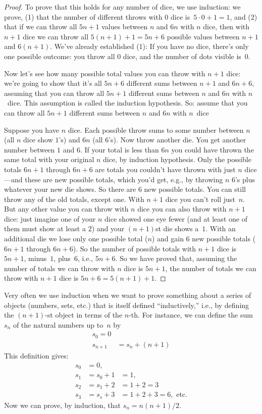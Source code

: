 \documentclass[../../../include/open-logic-section]{subfiles}
\begin{document}
\begin{proof}
To prove that this holds for any number of dice, we use induction: we
prove, (1) that the number of different throws with $0$ dice
is~$5\cdot0 + 1 = 1$, and (2) that if we can throw all $5n+1$ values
between $n$ and $6n$ with $n$ dice, then with $n+1$ dice we can
throw all $5(n+1)+1 = 5n+6$ possible values between $n+1$ and
$6(n+1)$.  We've already established (1): If you have no dice,
there's only one possible outcome: you throw all $0$ dice, and the
number of dots visible is~$0$.

Now let's see how many possible total values you can throw with $n+1$
dice: we're going to show that it's all $5n+6$ different sums between
$n+1$ and $6n+6$, assuming that you can throw all $5n+1$ different
sums between $n$ and $6n$ with $n$~dice. This assumption is called the
induction hypothesis.  So: assume that you can throw all $5n+1$
different sums between $n$ and $6n$ with $n$~dice

Suppose you have $n$ dice.  Each possible throw sums to some number
between $n$ (all $n$ dice show $1$'s) and $6n$ (all $6$'s).  Now throw
another die.  You get another number between $1$ and $6$.  If your
total is less than $6n$ you could have thrown the same total with your
original $n$ dice, by induction hypothesis.  Only the possible totals
$6n+1$ through $6n+6$ are totals you couldn't have thrown with just
$n$ dice---and these are new possible totals, which you'd get, e.g.,
by throwing $n$ $6$'s plus whatever your new die shows. So there are
$6$ new possible totals.  You can still throw any of the old totals,
except one. With $n+1$ dice you can't roll just~$n$. But any other
value you can throw with $n$ dice you can also throw with $n+1$ dice:
just imagine one of your $n$ dice showed one eye fewer (and at least
one of them must show at least a $2$) and your $(n+1)$st die shows
a~$1$. With an additional die we lose only one possible
total ($n$) and gain $6$ new possible totals ($6n+1$ through $6n+6$).
So the number of possible totals with $n+1$ dice is $5n+1$, minus~$1$,
plus~$6$, i.e., $5n+6$.  So we have proved that, assuming the number
of totals we can throw with $n$ dice is $5n+1$, the number of totals
we can throw with $n+1$ dice is $5n+6 = 5(n+1) + 1$.
\end{proof}

Very often we use induction when we want to prove something about a
series of objects (numbers, sets, etc.) that is itself defined
``inductively,'' i.e., by defining the $(n+1)$-st object in terms of
the $n$-th.  For instance, we can define the sum~$s_n$ of the natural
numbers up to~$n$ by
\begin{align*}
  s_0 = 0\\
  s_{n+1} & = s_n + (n+1)
\end{align*}
This definition gives:
\begin{align*}
  s_0 & = 0,\\
  s_1 & = s_0 + 1 & = 1,\\
  s_2 & = s_1 + 2 & = 1 + 2 = 3\\
  s_3 & = s_s + 3 & = 1 + 2 + 3 = 6, \text{ etc.}
\end{align*}
Now we can prove, by induction, that $s_n = n(n+1)/2$.
\end{document}
